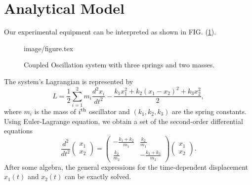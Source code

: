 \documentclass[12pt, a4paper, reprint, nofootinbib, twoside,  showkeys]{revtex4-1}
\begin{document}
\section{Analytical Model}
	Our experimental equipment can be interpreted as shown in FIG. (\ref{fig:system}).
	\begin{figure}[h]\centering
	{image/figure.tex}
	\caption{Coupled Oscillation system with three springs and two masses.}
	\label{fig:system}
	\end{figure}
	The system's Lagrangian is represented by 
	\begin{equation}
	L = \frac{1}{2}\sum_{i=1}^{2}m_i \frac{d^2x_i}{dt^2}
		-\frac{k_1x_1^2+k_2\left(x_1-x_2\right)^2+k_3x_2^2}{2},
	\end{equation}
	where $m_i$ is the mass of $i^{\rm th}$ oscillator and $\left(k_1,k_2,k_3\right)$ are the spring constants. Using Euler-Lagrange equation, we obtain a set of the second-order differential equations
	\begin{equation}
	\frac{d^2}{dt^2}\begin{pmatrix}x_1\\ x_2\end{pmatrix} =
	\begin{pmatrix}
	\displaystyle - \frac{k_1+k_2}{m_1}	&\displaystyle  \frac{k_2}{m_1}\\
	\displaystyle  \frac{k_2}{m_2} 		&\displaystyle  -\frac{k_2+k_3}{m_2}
	\end{pmatrix}
	\begin{pmatrix}x_1\\ x_2\end{pmatrix}.
	\end{equation}
	After some algebra, the general expressions for the time-dependent displacement $x_1\left(t\right)$ and $x_2\left(t\right)$ can be exactly solved.
\end{document}
